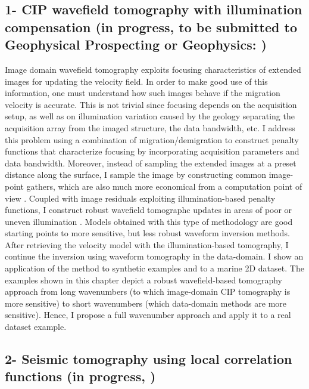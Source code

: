 \subsection{1- CIP wavefield tomography with illumination compensation (in progress, to be submitted 
to Geophysical Prospecting or Geophysics: \citep{pantin2015optimizing} )}

Image domain wavefield tomography exploits focusing characteristics of extended images 
for updating the velocity field. In order to make good use of this information, one must 
understand how such images behave if the migration velocity is accurate. This is not trivial 
since focusing depends on the acquisition setup, as well as on illumination variation caused by 
the geology separating the acquisition array from the imaged structure, the data bandwidth, etc. I 
address this problem using a combination of migration/demigration to construct penalty functions that
 characterize focusing by incorporating acquisition parameters and data bandwidth. Moreover, instead of
 sampling the extended images at a preset distance along the surface, I sample the image by constructing 
common image-point gathers, which are also much more economical from a computation point of view \citep{SavaVasconselos}. Coupled
 with image residuals exploiting illumination-based penalty functions, I construct robust wavefield 
tomographc updates in areas of poor or uneven illumination \citep{tony_seg:cwp12}. Models obtained with this type of methodology 
are good starting points to more sensitive, but less robust waveform inversion methods. After retrieving
the velocity model with the illumination-based tomography, I continue the inversion using 
waveform tomography in the data-domain. I show an application of the method to synthetic examples 
and to a marine 2D dataset. The examples shown in this chapter depict a 
robust wavefield-based tomography approach from long wavenumbers (to which image-domain
CIP tomography is more sensitive) to short wavenumbers (which data-domain methods
are more sensitive). Hence, I propose a full wavenumber approach and apply it to a real dataset 
example. 

\subsection{2- Seismic tomography using local correlation functions (in progress, \cite{DiazLcorr})}

